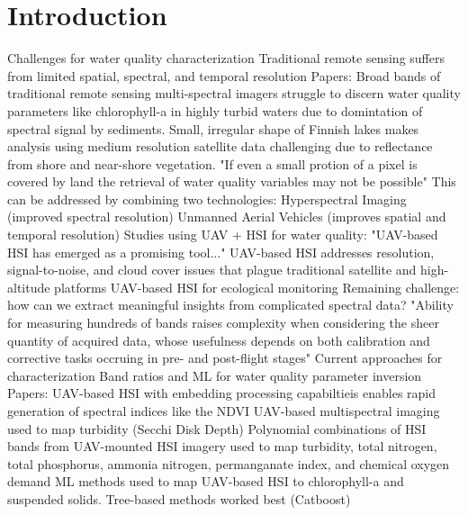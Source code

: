 \documentclass{article}
\begin{document}
\section*{Introduction}
\begin{outline}[enumerate]
\1 Challenges for water quality characterization
    \2 Traditional remote sensing suffers from limited spatial, spectral, and temporal resolution
        \3 Papers: 
            \4 Broad bands of traditional remote sensing multi-spectral imagers struggle to discern water quality parameters like chlorophyll-a in highly turbid waters due to domintation of spectral signal by sediments. \cite{ritchie2003remote}
            \4 Small, irregular shape of Finnish lakes makes analysis using medium resolution satellite data challenging due to reflectance from shore and near-shore vegetation. "If even a small protion of a pixel is covered by land the retrieval of water quality variables may not be possible" \cite{koponen2002lake}
    \2 This can be addressed by combining two technologies: 
        \3 Hyperspectral Imaging (improved spectral resolution)
        \3 Unmanned Aerial Vehicles (improves spatial and temporal resolution)
        \3 Studies using UAV + HSI for water quality: "UAV-based HSI has emerged as a promising tool..."
            \4 UAV-based HSI addresses resolution, signal-to-noise, and cloud cover issues that plague traditional satellite and high-altitude platforms\cite{banerjee2020uav}
            \4 UAV-based HSI for ecological monitoring \cite{arroyo2019implementation}
    \2 Remaining challenge: how can we extract meaningful insights from complicated spectral data?
        \3 "Ability for measuring hundreds of bands raises complexity when considering the sheer quantity of acquired data, whose usefulness depends on both calibration and corrective tasks occruing in pre- and post-flight stages" \cite{adao2017hyperspectral}
\1 Current approaches for characterization
    \2 Band ratios and ML for water quality parameter inversion
        \3 Papers:
            \4 UAV-based HSI with embedding processing capabiltieis enables rapid generation of spectral indices like the NDVI \cite{horstrand2019uav}
            \4 UAV-based multispectral imaging used to map turbidity (Secchi Disk Depth) \cite{vogt2016near}
            \4 Polynomial combinations of HSI bands from UAV-mounted HSI imagery used to map turbidity, total nitrogen, total phosphorus, ammonia nitrogen, permanganate index, and chemical oxygen demand \cite{zhang2022selection}
            \4 ML methods used to map UAV-based HSI to chlorophyll-a and suspended solids. Tree-based methods worked best (Catboost) \cite{lu2021retrieval}

\end{outline}
\end{document}
